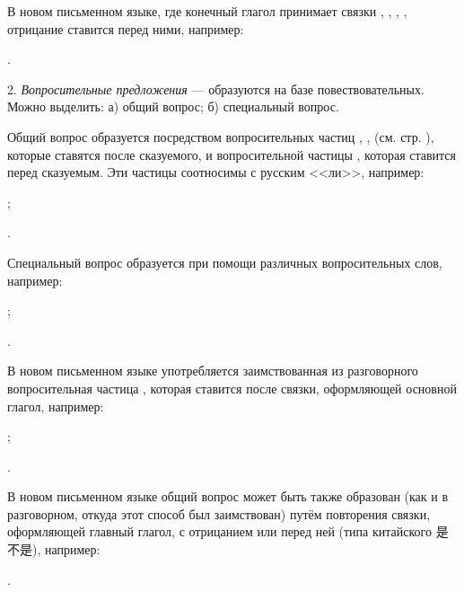 В новом письменном языке, где конечный глагол принимает связки
, , , ,
отрицание ставится перед ними, например:
\begin{prfsample}
	\item {}.
\end{prfsample}

2. \emph{Вопросительные предложения} --- образуются на базе повествовательных. Можно выделить: а) общий вопрос; б) специальный вопрос.

Общий вопрос образуется посредством вопросительных частиц
, ,  (см. стр. \pageref{sec:ss:soed_protiv}), которые ставятся после сказуемого, и вопросительной частицы , которая ставится перед сказуемым. Эти частицы соотносимы с русским <<ли>>, например:
\begin{prfsample}
	\item {};
	\item {}.
\end{prfsample}

Специальный вопрос образуется при помощи различных вопросительных слов, например:	
\begin{prfsample}
	\item {};
	\item {}.
\end{prfsample}

В новом письменном языке употребляется заимствованная из разговорного вопросительная частица , которая ставится после связки, оформляющей основной глагол, например:
\begin{prfsample}
	\item {};
	\item {}.
\end{prfsample}

В новом письменном языке общий вопрос может быть также образован (как и в разговорном, откуда этот способ был заимствован) путём повторения связки, оформляющей главный глагол, с отрицанием  или  перед ней (типа китайского {\chinfont 是不是}), например:
\begin{prfsample}
	\item {}.
\end{prfsample}


